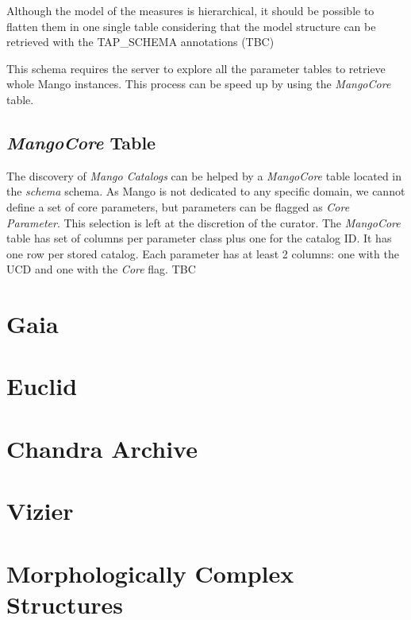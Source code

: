 \documentclass[11pt,a4paper]{ivoa}
\begin{document}
Although the model of the measures is hierarchical, it should be possible to flatten them in one single table considering that the model structure can be retrieved with the TAP\_SCHEMA annotations (TBC)

This schema requires the server to explore all the parameter tables to retrieve  whole Mango instances. This process can be speed up by using the \emph{MangoCore} table.

\subsection{ \emph{MangoCore} Table}

The discovery of \emph{Mango Catalogs} can be helped by a  \emph{MangoCore} table located in the  \emph{schema} schema. As Mango is not dedicated to any specific domain, we cannot define a set of core parameters, but parameters can be flagged as \emph{Core Parameter}. This selection is left at the discretion of the curator.
The \emph{MangoCore} table has set of columns per parameter class plus one for the catalog ID. It has one row per stored catalog. Each parameter has at least 2 columns: one with the UCD and one with the \emph{Core} flag. TBC


\appendix

\section{Gaia}


\section{Euclid}


\section{Chandra Archive}


\section{Vizier}


\section{Morphologically Complex Structures}

\end{document}
